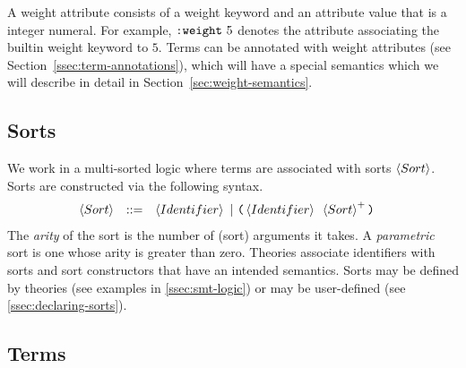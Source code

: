 \documentclass[english,a4paper,10pt]{article}
\begin{document}
A weight attribute consists of a weight keyword and an attribute value that is a integer numeral.
For example, $\texttt{:weight}\mbox{ }5$ denotes the attribute associating the builtin weight keyword to $5$.
Terms can be annotated with weight attributes (see Section~\ref{ssec:term-annotations}),
which will have a special semantics which we will describe in detail in Section~\ref{sec:weight-semantics}.

\subsection{Sorts}

We work in a multi-sorted logic where terms 
are associated with sorts $\left\langle Sort\right\rangle$.
Sorts are constructed via the following syntax.
\begin{alignat*}{1}
 & \begin{array}{rcl}
\left\langle Sort\right\rangle & ::= & \left\langle Identifier\right\rangle\mbox{ }|\mbox{ }\texttt{(}\left\langle Identifier\right\rangle\mbox{ }\left\langle Sort\right\rangle^{+}\texttt{)}\\
\end{array}
\end{alignat*}
The \emph{arity} of the sort is the number of (sort) arguments it takes.
A \emph{parametric} sort is one whose arity is greater than zero.
Theories associate identifiers with sorts and sort constructors
that have an intended semantics.
Sorts may be defined by theories (see examples in \cref{ssec:smt-logic})
or may be user-defined
(see \cref{ssec:declaring-sorts}).

\subsection{Terms}
\end{document}
